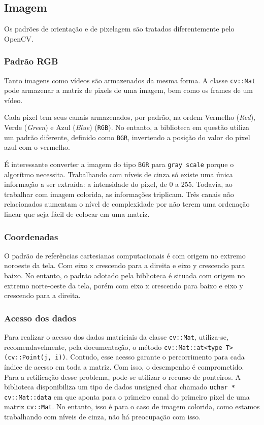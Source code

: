 \documentclass[10pt,twocolumn,letterpaper]{article}
\begin{document}
\subsection{Imagem}

Os padrões de orientação e de pixelagem são tratados diferentemente pelo OpenCV.


\subsubsection{Padrão RGB}

	Tanto imagens como vídeos são armazenados da mesma forma. A classe
\verb'cv::Mat' pode armazenar a matriz de pixels de uma imagem, bem como os
frames de um vídeo.

	Cada pixel tem seus canais armazenados, por padrão, na ordem Vermelho ({\em Red}),
Verde ({\em Green}) e Azul ({\em Blue}) (\verb'RGB'). No entanto, a biblioteca em questão
utiliza um padrão diferente, definido como \verb'BGR', invertendo a posição do valor do
pixel azul com o vermelho.

	É interessante converter a imagem do tipo \verb'BGR' para \verb'gray scale' porque
o algorítmo necessita. Trabalhando com níveis de cinza só existe uma única informação
a ser extraída: a intensidade do pixel, de 0 a 255. Todavia, ao trabalhar com imagem
colorida, as informações triplicam. Três canais não relacionados aumentam o nível de
complexidade por não terem uma ordenação linear que seja fácil de colocar em uma matriz.


\subsubsection{Coordenadas}

	O padrão de referências cartesianas computacionais é com origem no extremo noroeste
da tela. Com eixo x crescendo para a direita e eixo y crescendo para baixo. No entanto,
o padrão adotado pela biblioteca é situada com origem no extremo norte-oeste da tela,
porém com eixo x crescendo para baixo e eixo y crescendo para a direita.


\subsubsection{Acesso dos dados}

	Para realizar o acesso dos dados matriciais da classe \verb'cv::Mat', utiliza-se,
recomendavelmente, pela documentação\cite{devdocs}, o método
\verb'cv::Mat::at<type T> (cv::Point(j, i))'. Contudo, esse acesso garante o percorrimento
para cada índice de acesso em toda a matriz. Com isso, o desempenho é comprometido.
Para a retificação desse problema, pode-se utilizar o recurso de ponteiros. A biblioteca
disponibiliza um tipo de dados unsigned char chamado \verb'uchar * cv::Mat::data'
em que aponta para o primeiro canal do primeiro pixel de uma matriz \verb'cv::Mat'.
	No entanto, isso é para o caso de imagem colorida, como estamos trabalhando
com níveis de cinza, não há preocupação com isso.
\end{document}
